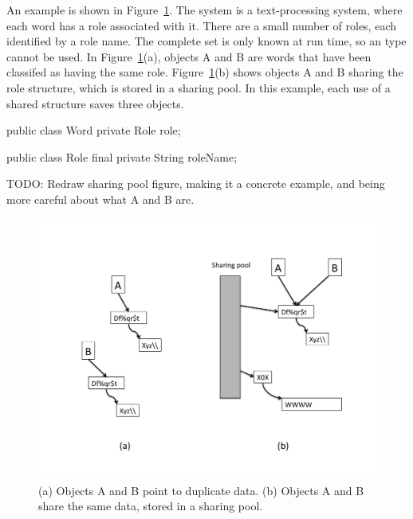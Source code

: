 An example is shown in Figure~\ref{fig:sharing-pool}. The system is a
text-processing system, where each word has a role associated with it. 
There are a small number of roles, each identified by a 
role name. The complete set is only known at run time, so an 
type cannot be used.  In Figure~\ref{fig:sharing-pool}(a), objects A and B are
words that have been classifed as having the same role. 
Figure~\ref{fig:sharing-pool}(b) shows objects A and B sharing the role
structure, which is stored in a sharing pool. In this example, each use of a
shared structure saves three objects.

\begin{shortlisting}
public class Word {
	private Role role;
}

public class Role {
	final private String roleName;
}
\end{shortlisting}

TODO: Redraw sharing pool figure, making it a concrete example, and being more
careful about what A and B are.
 \begin{figure}
  \centering
 \includegraphics[width=.80\textwidth]{part1/Figures/modelingdatatypes/sharing-pool.pdf}
  \caption{(a) Objects A and B point to duplicate data. (b) Objects A and B
  share the same data, stored in a sharing pool.}
  \label{fig:sharing-pool}
\end{figure}




